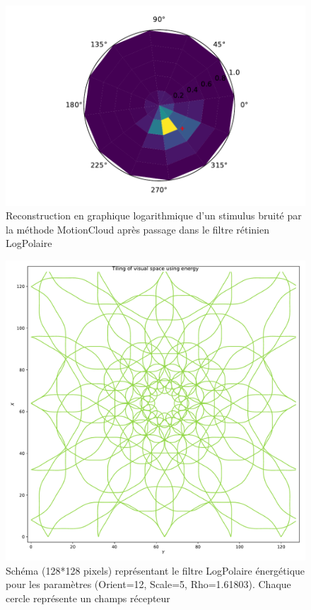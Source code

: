 \begin{figure}[th]
\centering
\includegraphics[scale=0.4]{Figures/mnist_log_motioncloud}
\decoRule
\caption[Figure]{Reconstruction en graphique logarithmique d'un stimulus bruité par la méthode MotionCloud après passage dans le filtre rétinien LogPolaire}
\label{fig:mnist_log_motioncloud}
\end{figure}

\begin{figure}[th]
\centering
\includegraphics[scale=0.4]{Figures/logpol_energy_filter}
\decoRule
\caption[Figure]{Schéma (128*128 pixels) représentant le filtre LogPolaire énergétique pour les paramètres (Orient=12, Scale=5, Rho=1.61803). Chaque cercle représente un champs récepteur}
\label{fig:energy_filter}
\end{figure}

